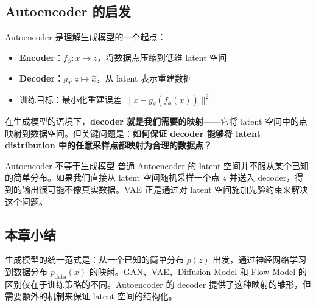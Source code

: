 \subsection{Autoencoder 的启发}

Autoencoder 是理解生成模型的一个起点：

\begin{itemize}
    \item \textbf{Encoder}：$f_\phi: x \mapsto z$，将数据点压缩到低维 latent 空间
    \item \textbf{Decoder}：$g_\theta: z \mapsto \hat{x}$，从 latent 表示重建数据
    \item 训练目标：最小化重建误差 $\|x - g_\theta(f_\phi(x))\|^2$
\end{itemize}

在生成模型的语境下，\textbf{decoder 就是我们需要的映射}——它将 latent 空间中的点映射到数据空间。但关键问题是：\textbf{如何保证 decoder 能够将 latent distribution 中的任意采样点都映射为合理的数据点？}

\begin{warningbox}{Autoencoder 不等于生成模型}
普通 Autoencoder 的 latent 空间并不服从某个已知的简单分布。如果我们直接从 latent 空间随机采样一个点 $z$ 并送入 decoder，得到的输出很可能不像真实数据。VAE 正是通过对 latent 空间施加先验约束来解决这个问题。
\end{warningbox}

\subsection{本章小结}

生成模型的统一范式是：从一个已知的简单分布 $p(z)$ 出发，通过神经网络学习到数据分布 $p_{\text{data}}(x)$ 的映射。GAN、VAE、Diffusion Model 和 Flow Model 的区别仅在于训练策略的不同。Autoencoder 的 decoder 提供了这种映射的雏形，但需要额外的机制来保证 latent 空间的结构化。

\newpage
